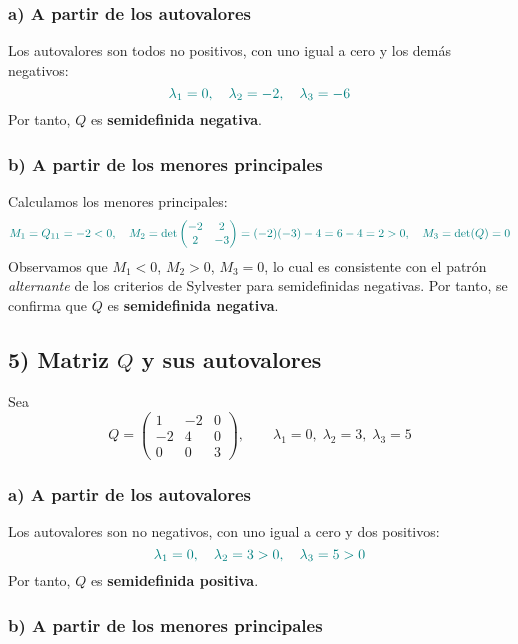 \documentclass{article}
\begin{document}
\subsubsection*{a) A partir de los autovalores}

Los autovalores son todos no positivos, con uno igual a cero y los demás negativos:
\[
\color{teal}
\lambda_1 = 0,\quad \lambda_2 = -2,\quad \lambda_3 = -6
\]
Por tanto, \(Q\) es \textbf{semidefinida negativa}.

\subsubsection*{b) A partir de los menores principales}

Calculamos los menores principales:
\[
\color{teal}
M_1 = Q_{11} = -2 < 0,
\quad
M_2 = \det\begin{pmatrix}-2 & 2\\2 & -3\end{pmatrix} = (-2)(-3)-4 = 6-4 = 2 > 0,
\quad
M_3 = \det(Q) = 0
\]
Observamos que \(M_1<0\), \(M_2>0\), \(M_3=0\), lo cual es consistente con el patrón
\emph{alternante} de los criterios de Sylvester para semidefinidas negativas.  
Por tanto, se confirma que \(Q\) es \textbf{semidefinida negativa}.

\subsection*{5) Matriz \(Q\) y sus autovalores}

Sea
\[
Q =
\begin{pmatrix}
1  & -2 & 0\\[4pt]
-2 &  4 & 0\\[4pt]
0  &  0 & 3
\end{pmatrix},
\qquad
\lambda_1 = 0,\;\lambda_2 = 3,\;\lambda_3 = 5
\]

\subsubsection*{a) A partir de los autovalores}

Los autovalores son no negativos, con uno igual a cero y dos positivos:
\[
\color{teal}
\lambda_1 = 0,\quad \lambda_2 = 3 > 0,\quad \lambda_3 = 5 > 0
\]
Por tanto, \(Q\) es \textbf{semidefinida positiva}.

\subsubsection*{b) A partir de los menores principales}
\end{document}
